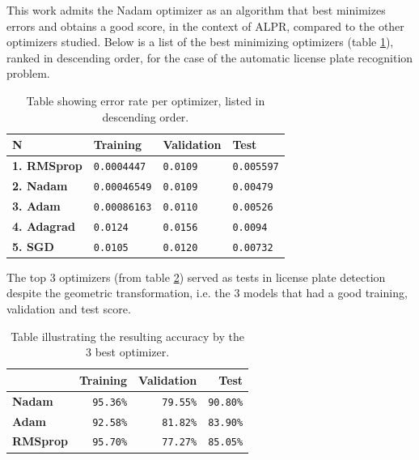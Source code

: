 \documentclass[lnbip]{svmultln}
\begin{document}
	This work admits the Nadam optimizer as an algorithm that best minimizes errors and obtains a good score, in the context of ALPR, compared to the other optimizers studied. Below is a list of the best minimizing optimizers (table \ref{tab:error_rank}), ranked in descending order, for the case of the automatic license plate recognition problem.
		\begin{table}[H]
			\centering
			\begin{tabular}{|l|l|l|l|}
				\hline
				\textbf{N\textdegree} & \textbf{Training} & \textbf{Validation} & \textbf{Test} \\
				\hline
				
				\textbf{1. RMSprop} &
				\texttt{0.0004447} &
				\texttt{0.0109} &
				\texttt{0.005597} \\
				\hline
				
				\textbf{2. Nadam} &
				\texttt{0.00046549} &
				\texttt{0.0109} &
				\texttt{0.00479} \\
				\hline
				
				\textbf{3. Adam} &
				\texttt{0.00086163} &
				\texttt{0.0110} &
				\texttt{0.00526} \\
				\hline
				
				\textbf{4. Adagrad} &
				\texttt{0.0124} &
				\texttt{0.0156} &
				\texttt{0.0094} \\
				\hline
				
				\textbf{5. SGD} &
				\texttt{0.0105} &
				\texttt{0.0120} &
				\texttt{0.00732} \\
				\hline
			\end{tabular} 
		\caption{Table showing error rate per optimizer, listed in descending order. }
		\label{tab:error_rank}
		\end{table}	
		The top 3 optimizers (from table \ref{tab:accuracy_rank}) served as tests in license plate detection despite the geometric transformation, i.e. the 3 models that had a good training, validation and test score.
		\begin{table}[H]
			\centering
			\begin{tabular}{|l|r|r|r|}
				\hline
				& \textbf{Training} & \textbf{Validation} & \textbf{Test} \\
				
				\hline
				\textbf{Nadam} &
				\texttt{95.36\%} &
				\texttt{79.55\%} &
				\texttt{90.80\%} \\
				\hline
				\textbf{Adam} &
				\texttt{92.58\%} &
				\texttt{81.82\%} &
				\texttt{83.90\%} \\
				\hline
				\textbf{RMSprop} &
				\texttt{95.70\%} &
				\texttt{77.27\%} &
				\texttt{85.05\%} \\
				\hline
				
			\end{tabular}
		\caption{Table illustrating the resulting accuracy by the 3 best optimizer.} 
		\label{tab:accuracy_rank}
		\end{table}
	
\end{document}

